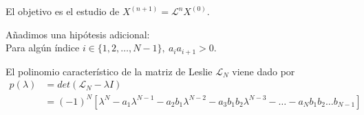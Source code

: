 El objetivo es el estudio de $X^{(n+1)} = \mathcal L^nX^{(0)}$.

Añadimos una hipótesis adicional:\\
Para algún índice $i \in \{1,2,\hdots,N-1\},\  a_ia_{i+1}> 0$.

     \begin{nprop}
            El polinomio característico de la matriz de Leslie $\mathcal L_N$ viene dado por \begin{align*}
                \label{}
                p(\lambda) &= det(\mathcal L_N - \lambda I) \\
                           &= (-1)^N \left[ \lambda^N - a_1\lambda^{N-1} - a_2b_1\lambda^{N-2} - a_3 b_1 b_2\lambda^{N-3} - \hdots - a_N b_1 b_2\hdots b_{N-1} \right]
            \end{align*}
     \end{nprop}


